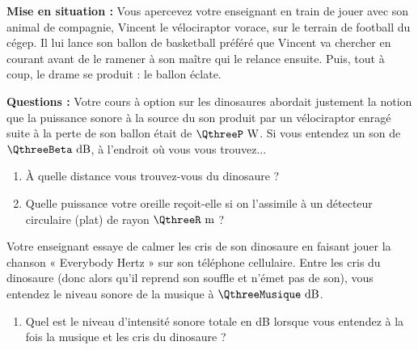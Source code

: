 
\textbf{Mise en situation :} Vous apercevez votre enseignant en train de jouer avec son animal de compagnie, Vincent le vélociraptor vorace, sur le terrain de football du cégep. Il lui lance son ballon de basketball préféré que Vincent va chercher en courant avant de le ramener à son maître qui le relance ensuite. Puis, tout à coup, le drame se produit : le ballon éclate.

\textbf{Questions :} Votre cours à option sur les dinosaures abordait justement la notion que la puissance sonore à la source du son produit par un vélociraptor enragé suite à la perte de son ballon était de $\QthreeP\text{ W}$. Si vous entendez un son de $\QthreeBeta\text{ dB}$, à l'endroit où vous vous trouvez...

\begin{enumerate}[label=\alph*)]
    \item À quelle distance vous trouvez-vous du dinosaure ?
    \item Quelle puissance votre oreille reçoit-elle si on l'assimile à un détecteur circulaire (plat) de rayon $\QthreeR\text{ m}$ ?
\end{enumerate}

Votre enseignant essaye de calmer les cris de son dinosaure en faisant jouer la chanson « Everybody Hertz » sur son téléphone cellulaire. Entre les cris du dinosaure (donc alors qu'il reprend son souffle et n'émet pas de son), vous entendez le niveau sonore de la musique à $\QthreeMusique\text{ dB}$.

\begin{enumerate}[label= c)]
    \item Quel est le niveau d'intensité sonore totale en dB lorsque vous entendez à la fois la musique et les cris du dinosaure ?
\end{enumerate}